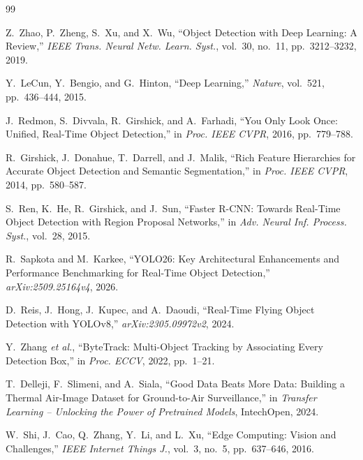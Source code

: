 \documentclass[12pt,a4paper]{report}
\begin{document}

\begin{thebibliography}{99}

Z.~Zhao, P.~Zheng, S.~Xu, and X.~Wu,
``Object Detection with Deep Learning: A Review,''
\textit{IEEE Trans. Neural Netw. Learn. Syst.}, vol.~30, no.~11, pp.~3212--3232, 2019.

Y.~LeCun, Y.~Bengio, and G.~Hinton,
``Deep Learning,''
\textit{Nature}, vol.~521, pp.~436--444, 2015.

J.~Redmon, S.~Divvala, R.~Girshick, and A.~Farhadi,
``You Only Look Once: Unified, Real-Time Object Detection,''
in \textit{Proc. IEEE CVPR}, 2016, pp.~779--788.

R.~Girshick, J.~Donahue, T.~Darrell, and J.~Malik,
``Rich Feature Hierarchies for Accurate Object Detection and Semantic Segmentation,''
in \textit{Proc. IEEE CVPR}, 2014, pp.~580--587.

S.~Ren, K.~He, R.~Girshick, and J.~Sun,
``Faster R-CNN: Towards Real-Time Object Detection with Region Proposal Networks,''
in \textit{Adv. Neural Inf. Process. Syst.}, vol.~28, 2015.

R.~Sapkota and M.~Karkee,
``YOLO26: Key Architectural Enhancements and Performance Benchmarking for Real-Time Object Detection,''
\textit{arXiv:2509.25164v4}, 2026.

D.~Reis, J.~Hong, J.~Kupec, and A.~Daoudi,
``Real-Time Flying Object Detection with YOLOv8,''
\textit{arXiv:2305.09972v2}, 2024.

Y.~Zhang \textit{et al.},
``ByteTrack: Multi-Object Tracking by Associating Every Detection Box,''
in \textit{Proc. ECCV}, 2022, pp.~1--21.

T.~Delleji, F.~Slimeni, and A.~Siala,
``Good Data Beats More Data: Building a Thermal Air-Image Dataset for Ground-to-Air Surveillance,''
in \textit{Transfer Learning -- Unlocking the Power of Pretrained Models}, IntechOpen, 2024.

W.~Shi, J.~Cao, Q.~Zhang, Y.~Li, and L.~Xu,
``Edge Computing: Vision and Challenges,''
\textit{IEEE Internet Things J.}, vol.~3, no.~5, pp.~637--646, 2016.


\end{thebibliography}
\end{document}
